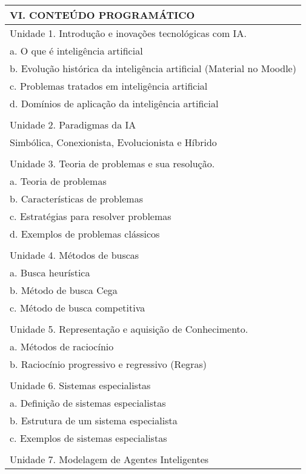 \documentclass[12pt]{article}
\begin{document}
\begin{longtable}{|L{1.025\textwidth}|} \hline
%
{\bf VI. CONTEÚDO PROGRAMÁTICO } \\ \hline

Unidade 1. Introdução e inovações tecnológicas com IA.\\
           a. O que é inteligência artificial\\
           b. Evolução histórica da inteligência artificial (Material no Moodle)\\
           c. Problemas tratados em inteligência artificial\\
           d. Domínios de aplicação da inteligência artificial\\
\\
Unidade 2. Paradigmas da IA\\
                  Simbólica, Conexionista, Evolucionista e Híbrido\\
\\
Unidade 3. Teoria de problemas e sua resolução.\\
a. Teoria de problemas\\
b. Características de problemas\\
c. Estratégias para resolver problemas\\
d. Exemplos de problemas clássicos\\
\\
Unidade 4. Métodos de buscas\\
a. Busca heurística  \\
b. Método de busca Cega\\
c. Método de busca competitiva\\
         \\
Unidade 5. Representação e aquisição de Conhecimento.\\
                  a. Métodos de raciocínio \\
 b. Raciocínio progressivo e regressivo (Regras)\\
\\
Unidade 6. Sistemas especialistas\\
           a. Definição de sistemas especialistas\\
           b. Estrutura de um sistema especialista\\
           c. Exemplos de sistemas especialistas\\
\\
Unidade 7. Modelagem de Agentes Inteligentes\\

\end{longtable}
\end{document}
